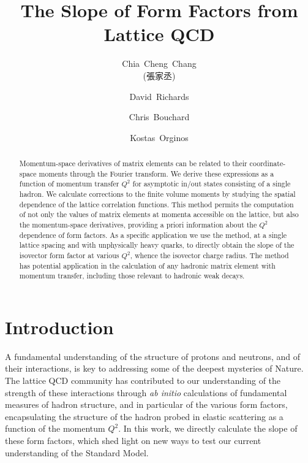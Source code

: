 \documentclass[prd,aps,twocolumn,superscriptaddress,tightenlines,nofootinbib,floatfix,preprintnumbers,10pt]{revtex4-1}
\newcommand{\mydate}{\ \today \ - \number\hour :\number\minute}
\begin{document}
\title{The Slope of Form Factors from Lattice QCD}

\author{Chia~Cheng~Chang \begin{CJK*}{UTF8}{bsmi}(張家丞)\end{CJK*}}
\affiliation{\ithems}
\affiliation{\lblnsd}
\affiliation{\ucb}


\author{David~Richards}
\affiliation{\jlab}

\author{Chris~Bouchard}
\affiliation{\glasgow}

\author{Kostas~Orginos}
\affiliation{\wm}
\affiliation{\jlab}




\begin{abstract}
Momentum-space derivatives of matrix elements can be related to their coordinate-space moments through the Fourier transform. We derive these expressions as a function of momentum transfer $Q^2$ for asymptotic in/out states consisting of a single hadron. We calculate corrections to the finite volume moments by studying the spatial dependence of the lattice correlation functions. This method permits the computation of not only the values of matrix elements at momenta accessible on the lattice, but also the momentum-space derivatives, providing a priori information about the $Q^2$ dependence of form factors. As a specific application we use the method, at a single lattice spacing and with unphysically heavy quarks, to directly obtain the slope of the isovector form factor at various $Q^2$, whence the isovector charge radius. The method has potential application in the calculation of any hadronic matrix element with momentum transfer, including those relevant to hadronic weak decays.
\end{abstract}
\maketitle



\section{Introduction\label{sec:intro}}
A fundamental understanding of the structure of protons and neutrons,
and of their interactions, is key to addressing some of the deepest
mysteries of Nature.  The lattice QCD community has contributed to our
understanding of the strength of these interactions through \textit{ab
  initio} calculations of fundamental measures of hadron structure,
and in particular of the various form factors, encapsulating the
structure of the hadron probed in elastic scattering as a function of
the momentum $Q^2$. In this work, we 
directly calculate the slope of these form factors, which shed light
on new ways to test our current understanding of the Standard Model.
\end{document}
